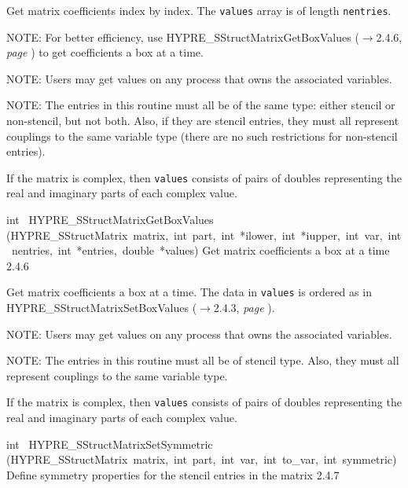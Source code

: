 \documentclass{article}
\begin{document}
\begin{cxxentry}
\begin{cxxentry}
\begin{cxxfunction}
\begin{cxxdoc}
Get matrix coefficients index by index.  The {\tt values} array is of length
{\tt nentries}.

NOTE: For better efficiency, use HYPRE\_SStructMatrixGetBoxValues ($\rightarrow$2.4.6, {\em page \pageref{cxx.2.4.6}}) to get
coefficients a box at a time.

NOTE: Users may get values on any process that owns the associated variables.

NOTE: The entries in this routine must all be of the same type: either
stencil or non-stencil, but not both.  Also, if they are stencil entries,
they must all represent couplings to the same variable type (there are no
such restrictions for non-stencil entries).

If the matrix is complex, then {\tt values} consists of pairs of doubles
representing the real and imaginary parts of each complex value.


\end{cxxdoc}
\end{cxxfunction}
\begin{cxxfunction}
{int\ }
        {HYPRE\_SStructMatrixGetBoxValues}
        {(HYPRE\_SStructMatrix\ matrix,\ int\ part,\ int\ *ilower,\ int\ *iupper,\ int\ var,\ int\ nentries,\ int\ *entries,\ double\ *values)}
        {
Get matrix coefficients a box at a time}
        {2.4.6}
\begin{cxxdoc}

Get matrix coefficients a box at a time.  The data in {\tt values} is
ordered as in HYPRE\_SStructMatrixSetBoxValues ($\rightarrow$2.4.3, {\em page \pageref{cxx.2.4.3}}).

NOTE: Users may get values on any process that owns the associated variables.

NOTE: The entries in this routine must all be of stencil type.  Also, they
must all represent couplings to the same variable type.

If the matrix is complex, then {\tt values} consists of pairs of doubles
representing the real and imaginary parts of each complex value.


\end{cxxdoc}
\end{cxxfunction}
\begin{cxxfunction}
{int\ }
        {HYPRE\_SStructMatrixSetSymmetric}
        {(HYPRE\_SStructMatrix\ matrix,\ int\ part,\ int\ var,\ int\ to\_var,\ int\ symmetric)}
        {
Define symmetry properties for the stencil entries in the matrix}
        {2.4.7}
\begin{cxxdoc}


\end{cxxdoc}
\end{cxxfunction}
\end{cxxentry}
\end{cxxentry}
\end{document}
